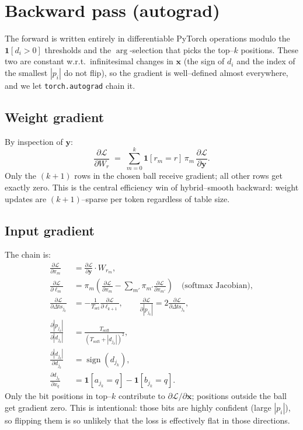 \documentclass[11pt]{article}
\newcommand{\nalt}{k}
\newcommand{\bts}{\mathrm{ts}}
\newcommand{\Tsoft}{T_{\!\text{soft}}}
\newcommand{\Tsel}{T_{\!\text{sel}}}
\begin{document}
\section{Backward pass (autograd)}

The forward is written entirely in differentiable PyTorch operations modulo
the $\bm{1}[d_i > 0]$ thresholds and the $\arg$-selection that picks the
top--$\nalt$ positions. These two are constant w.r.t.\ infinitesimal changes
in $\bm{x}$ (the sign of $d_i$ and the index of the smallest $|p_i|$ do not
flip), so the gradient is well--defined almost everywhere, and we let
\texttt{torch.autograd} chain it.

\subsection{Weight gradient}

By inspection of $\bm{y}$:
\begin{equation}
  \frac{\partial \mathcal{L}}{\partial W_{r}}
  \;=\; \sum_{m=0}^{\nalt} \mathbf{1}[r_m = r]\, \pi_m \,
  \frac{\partial \mathcal{L}}{\partial \bm{y}}.
\end{equation}
Only the $(\nalt + 1)$ rows in the chosen ball receive gradient; all other
rows get exactly zero. This is the central efficiency win of hybrid--smooth
backward: weight updates are $(\nalt + 1)$--sparse per token regardless of
table size.

\subsection{Input gradient}

The chain is:
\begin{align}
  \frac{\partial \mathcal{L}}{\partial \pi_m}
  &= \frac{\partial \mathcal{L}}{\partial \bm{y}} \cdot W_{r_m}, \\
  \frac{\partial \mathcal{L}}{\partial \ell_m}
  &= \pi_m \left( \frac{\partial \mathcal{L}}{\partial \pi_m}
                 - \sum_{m'} \pi_{m'} \frac{\partial \mathcal{L}}{\partial \pi_{m'}} \right)
     \quad \text{(softmax Jacobian)}, \\
  \frac{\partial \mathcal{L}}{\partial \Delta \bts_{j_k}}
  &= -\frac{1}{\Tsel} \frac{\partial \mathcal{L}}{\partial \ell_{k+1}},
  \qquad
  \frac{\partial \mathcal{L}}{\partial |p_{j_k}|}
  = 2 \frac{\partial \mathcal{L}}{\partial \Delta \bts_{j_k}}, \\
  \frac{\partial |p_{j_k}|}{\partial |d_{j_k}|}
  &= \frac{\Tsoft}{(\Tsoft + |d_{j_k}|)^2}, \\
  \frac{\partial |d_{j_k}|}{\partial d_{j_k}}
  &= \operatorname{sign}(d_{j_k}), \\
  \frac{\partial d_{j_k}}{\partial x_q}
  &= \mathbf{1}[a_{j_k} = q] - \mathbf{1}[b_{j_k} = q].
\end{align}
Only the bit positions in $\text{top--}\nalt$ contribute to
$\partial \mathcal{L}/\partial \bm{x}$; positions outside the ball get
gradient zero. This is intentional: those bits are highly confident
(large $|p_i|$), so flipping them is so unlikely that the loss is
effectively flat in those directions.
\end{document}
